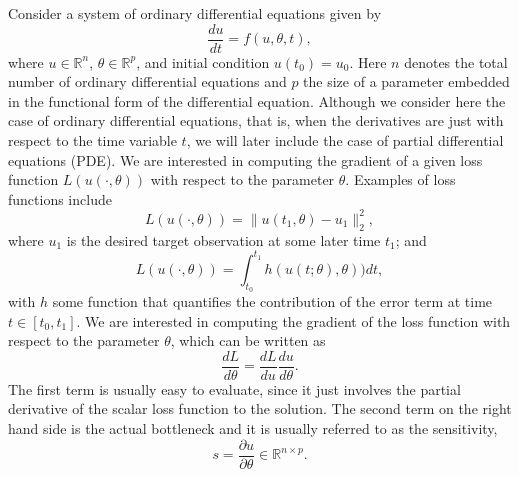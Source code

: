 Consider a system of ordinary differential equations given by
\begin{equation}
 \frac{du}{dt} = f(u, \theta, t),
 \label{eq:original_ODE}
\end{equation}
where $u \in \mathbb{R}^n$, $\theta \in \mathbb R^p$, and initial condition $u(t_0) = u_0$.
Here $n$ denotes the total number of ordinary differential equations and $p$ the size of a parameter embedded in the functional form of the differential equation.
Although we consider here the case of ordinary differential equations, that is, when the derivatives are just with respect to the time variable $t$, we will later include the case of partial differential equations (PDE).
We are interested in computing the gradient of a given loss function $L(u(\cdot, \theta))$ with respect to the parameter $\theta$.
Examples of loss functions include
\begin{equation}
 L(u(\cdot, \theta)) = \| u(t_1, \theta) - u_1 \|_2^2,
\end{equation}
where $u_1$ is the desired target observation at some later time $t_1$; and
\begin{equation}
 L(u(\cdot, \theta)) = \int_{t_0}^{t_1} h( u(t;\theta), \theta) ) dt, 
\end{equation}
with $h$ some function that quantifies the contribution of the error term at time $t \in [t_0, t_1]$.
We are interested in computing the gradient of the loss function with respect to the parameter $\theta$, which can be written as
\begin{equation}
 \frac{dL}{d\theta} = \frac{dL}{du} \frac{du}{d\theta}.
 \label{eq:dLdtheta_VJP}
\end{equation} 
The first term is usually easy to evaluate, since it just involves the partial derivative of the scalar loss function to the solution.
The second term on the right hand side is the actual bottleneck and it is usually referred to as the sensitivity,
\begin{equation}
 s = \frac{\partial u}{\partial \theta} \in \mathbb R^{n \times p}.
\end{equation}

